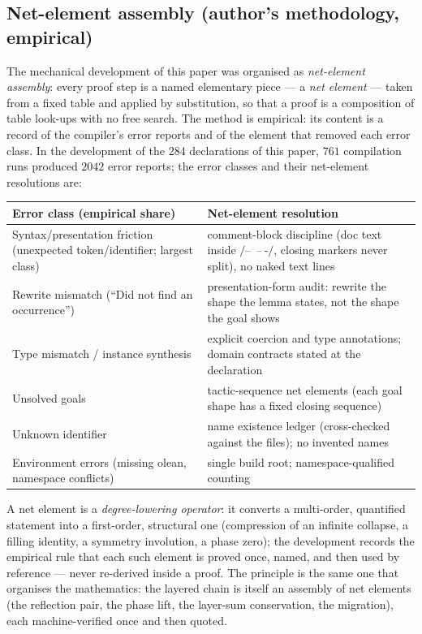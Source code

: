 \documentclass{article}
\begin{document}
\subsection{Net-element assembly (author's methodology, empirical)}
\label{sec:neta}

The mechanical development of this paper was organised as
\emph{net-element assembly}: every proof step is a named elementary
piece --- a \emph{net element} --- taken from a fixed table and applied
by substitution, so that a proof is a composition of table look-ups
with no free search. The method is empirical: its content is a record of
the compiler's error reports and of the element that removed each error
class. In the development of the 284 declarations of this paper, $761$
compilation runs produced $2042$ error reports; the error classes and
their net-element resolutions are:

\begin{center}
{\small
\begin{tabular}{@{}p{5.6cm}p{8.6cm}@{}}
\hline
Error class (empirical share) & Net-element resolution \\
\hline
Syntax/presentation friction (unexpected token/identifier; largest class) &
comment-block discipline (doc text inside $\texttt{/-- }$\,--\,$\texttt{-/}$, closing
markers never split), no naked text lines \\
Rewrite mismatch (``Did not find an occurrence'') &
presentation-form audit: rewrite the shape the lemma states, not the shape
the goal shows \\
Type mismatch / instance synthesis &
explicit coercion and type annotations; domain contracts stated at the
declaration \\
Unsolved goals & tactic-sequence net elements (each goal shape has a fixed
closing sequence) \\
Unknown identifier & name existence ledger (cross-checked against the
files); no invented names \\
Environment errors (missing olean, namespace conflicts) &
single build root; namespace-qualified counting \\
\hline
\end{tabular}
}
\end{center}

A net element is a \emph{degree-lowering operator}: it converts a
multi-order, quantified statement into a first-order, structural one
(compression of an infinite collapse, a filling identity, a symmetry
involution, a phase zero); the development records the empirical rule
that each such element is proved once, named, and then used by
reference --- never re-derived inside a proof. The principle is the
same one that organises the mathematics: the layered chain is itself an
assembly of net elements (the reflection pair, the phase lift, the
layer-sum conservation, the migration), each machine-verified once and
then quoted.
\end{document}
